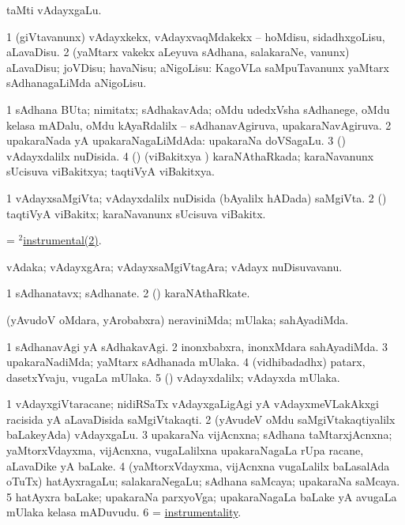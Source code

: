 \noindent 
\gl{\pagu}
\bmng
{} taMti vAdayxgaLu. 
\emng
\eentry

\bentry
{}
\gl{\sakirx}
\bmng
\bnum
\num{1} (giVtavanunx) vAdayxkekx, vAdayxvaqMdakekx -- hoMdisu, sidadhxgoLisu, aLavaDisu. 
\num{2} (yaMtarx \mo vakekx aLeyuva sAdhana, salakaraNe, \mo vanunx) aLavaDisu; joVDisu; havaNisu; aNigoLisu:  KagoVLa saMpuTavanunx yaMtarx sAdhanagaLiMda aNigoLisu. 
\enum
\emng
\eentry

\bentry
{}
\gl{\gu}
\bmng
\bnum
\num{1} sAdhana BUta; nimitatx; sAdhakavAda; oMdu udedxVsha sAdhanege, oMdu kelasa mADalu, oMdu kAyaRdalilx -- sAdhanavAgiruva, upakaraNavAgiruva. 
\num{2} upakaraNada yA upakaraNagaLiMdAda:  upakaraNa doVSagaLu. 
\num{3} (\saM) vAdayxdalilx nuDisida. 
\num{4} (\vAyx) (viBakitxya \vi) karaNAthaRkada; karaNavanunx sUcisuva viBakitxya; taqtiVyA viBakitxya. 
\enum
\emng
\eentry

\bentry
{}
\gl{\nA}
\bmng
\bnum
\num{1} vAdayxsaMgiVta; vAdayxdalilx nuDisida (bAyalilx hADada) saMgiVta. 
\hypertarget{instrumental(2)2}{} 
\num{2} (\vAyx) taqtiVyA viBakitx; karaNavanunx sUcisuva viBakitx. 
\enum
\emng
\eentry

\bentry
{}
\gl{\nA}
\bmng
= \hyperlink{instrumental(2)2}{$^2$instrumental(2)}. 
\emng
\eentry

\bentry
{}
\gl{\nA}
\bmng
vAdaka; vAdayxgAra; vAdayxsaMgiVtagAra; vAdayx nuDisuvavanu. 
\emng
\eentry

\bentry
{}
\gl{\nA}
\bmng
\bnum
\num{1} sAdhanatavx; sAdhanate. 
\num{2} (\vAyx) karaNAthaRkate. 
\enum
\emng

\noindent 
\gl{\pagu}
\bmng
{} (yAvudoV oMdara, yArobabxra) neraviniMda; mUlaka; sahAyadiMda. 
\emng
\eentry

\bentry
{}
\gl{\kirxvi}
\bmng
\bnum
\num{1} sAdhanavAgi yA sAdhakavAgi. 
\num{2} inonxbabxra, inonxMdara sahAyadiMda. 
\num{3} upakaraNadiMda; yaMtarx sAdhanada mUlaka. 
\num{4} (vidhibadadhx) patarx, dasetxYvaju, \mo vugaLa mUlaka. 
\num{5} (\saM) vAdayxdalilx; vAdayxda mUlaka. 
\enum
\emng
\eentry

\bentry
{}
\gl{\nA}
\bmng
\bnum
\num{1} vAdayxgiVtaracane; nidiRSaTx vAdayxgaLigAgi yA vAdayxmeVLakAkxgi racisida yA aLavaDisida saMgiVtakaqti. 
\num{2} (yAvudeV oMdu saMgiVtakaqtiyalilx baLakeyAda) vAdayxgaLu. 
\num{3} upakaraNa vijAcnxna; sAdhana taMtarxjAcnxna; yaMtorxVdayxma, vijAcnxna, \mo vugaLalilxna upakaraNagaLa rUpa racane, aLavaDike yA baLake. 
\num{4} (yaMtorxVdayxma, vijAcnxna \mo vugaLalilx baLasalAda oTuTx) hatAyxragaLu; salakaraNegaLu; sAdhana saMcaya; upakaraNa saMcaya. 
\num{5} hatAyxra baLake; upakaraNa parxyoVga; upakaraNagaLa baLake yA avugaLa mUlaka kelasa mADuvudu. 
\num{6} =  \hyperlink{instrumentality}{instrumentality}. 
\enum
\emng
\eentry

